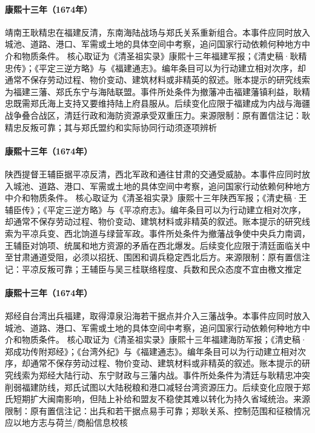 \hypertarget{civic:EQ-1674-GENG-JINGZHONG}{}\paragraph{康熙十三年（1674年）}靖南王耿精忠在福建反清，东南海陆战场与郑氏关系重新组合。本事件应同时放入城池、道路、港口、军需或土地的具体空间中考察，追问国家行动依赖何种地方中介和物质条件。 核心取证为《清圣祖实录》康熙十三年福建军报；《清史稿·耿精忠传》；《平定三逆方略》与《福建通志》。编年条目可以为行动建立相对次序，却通常不保存劳动过程、物价变动、建筑材料或非精英的叙述。账本提示的研究线索为福建三藩、郑氏东宁与海陆联盟。事件所处条件为撤藩冲击福建藩镇利益，耿精忠既需郑氏海上支持又要维持陆上府县服从。后续变化应限于福建成为内战与海疆战争叠合战区，清廷行政和海防资源承受双重压力。来源限制：原有置信注记：耿精忠反叛可靠；其与郑氏盟约和实际协同行动须逐项辨析
\hypertarget{civic:EQ-1674-WANG-FUCHEN}{}\paragraph{康熙十三年（1674年）}陕西提督王辅臣据平凉反清，西北军政和通往甘肃的交通受威胁。本事件应同时放入城池、道路、港口、军需或土地的具体空间中考察，追问国家行动依赖何种地方中介和物质条件。 核心取证为《清圣祖实录》康熙十三年陕西军报；《清史稿·王辅臣传》；《平定三逆方略》与《平凉府志》。编年条目可以为行动建立相对次序，却通常不保存劳动过程、物价变动、建筑材料或非精英的叙述。账本提示的研究线索为平凉兵变、西北饷道与绿营军政。事件所处条件为撤藩战争使中央兵力南调，王辅臣对饷项、统属和地方资源的矛盾在西北爆发。后续变化应限于清廷面临关中至甘肃通道受阻，必须以招抚、围困和调兵稳定西北后方。来源限制：原有置信注记：平凉反叛可靠；王辅臣与吴三桂联络程度、兵数和民众态度不宜由檄文推定
\hypertarget{civic:EQ-1674-ZHENG-JING-FUJIAN}{}\paragraph{康熙十三年（1674年）}郑经自台湾出兵福建，取得漳泉沿海若干据点并介入三藩战争。本事件应同时放入城池、道路、港口、军需或土地的具体空间中考察，追问国家行动依赖何种地方中介和物质条件。 核心取证为《清圣祖实录》康熙十三年福建海防军报；《清史稿·郑成功传附郑经》；《台湾外纪》与《福建通志》。编年条目可以为行动建立相对次序，却通常不保存劳动过程、物价变动、建筑材料或非精英的叙述。账本提示的研究线索为郑经大陆行动、东宁财政与三藩内战。事件所处条件为清廷与耿精忠冲突削弱福建防线，郑氏试图以大陆税粮和港口减轻台湾资源压力。后续变化应限于郑氏短期扩大闽南影响，但陆上补给和盟友不稳使其难以转化为持久省域统治。来源限制：原有置信注记：出兵和若干据点易手可靠；郑耿关系、控制范围和征粮情况应以地方志与荷兰/商船信息校核
